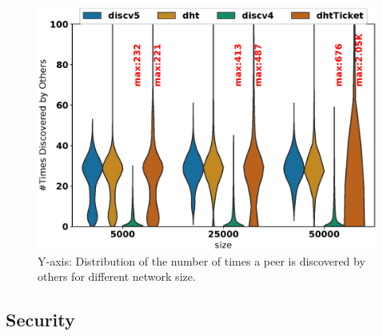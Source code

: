 \begin{figure}[!h]
\includegraphics[width=\linewidth]{results/efficiency/violin_size_wasDiscovered.eps}
\caption{Y-axis: Distribution of the number of times a peer is discovered by others for different network size.} 
\label{fig:efficiency_size}
\end{figure}



\subsection{Security}


